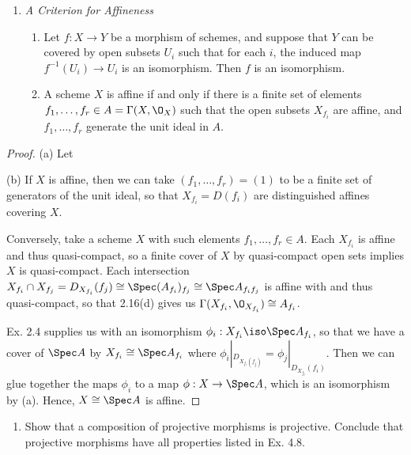 \documentclass[12pt]{amsart}
\begin{document}
\begin{enumerate}
  \item[2.17.] {
      \emph{A Criterion for Affineness}
      \begin{enumerate}
        \item Let $f:X\to Y$ be a morphism of schemes, and suppose that $Y$ can be covered by open subsets $U_i$ such that for each $i$, the induced map $f^{-1}(U_i)\to U_i$ is an isomorphism.
          Then $f$ is an isomorphism.
        \item A scheme $X$ is affine if and only if there is a finite set of elements $f_1,\ldots, f_r\in A=\Gamma(X,\O_X)$ such that the open subsets $X_{f_i}$ are affine, and $f_1,\ldots, f_r$ generate the unit ideal in $A$.
      \end{enumerate}
    }
\end{enumerate}

\begin{proof}
  (a) Let 

  (b) If $X$ is affine, then we can take $(f_1,\ldots, f_r)=(1)$ to be a finite set of generators of the unit ideal, so that $X_{f_i}=D(f_i)$ are distinguished affines covering $X$.
  
  Conversely, take a scheme $X$ with such elements $f_1,\ldots, f_r\in A$.
  Each $X_{f_i}$ is affine and thus quasi-compact, so a finite cover of $X$ by quasi-compact open sets implies $X$ is quasi-compact.
  Each intersection $X_{f_i}\cap X_{f_j}=D_{X_{f_i}}(f_j)\cong \Spec (A_{f_i})_{f_j}\cong \Spec A_{f_if_j}$ is affine with and thus quasi-compact, so that 2.16(d) gives us $\Gamma(X_{f_i},\O_{X_{f_i}})\cong A_{f_i}$.

  Ex. 2.4 supplies us with an isomorphism $\phi_i:X_{f_i}\iso\Spec A_{f_i}$, so that we have a cover of $\Spec A$ by $X_{f_i}\cong \Spec A_{f_i}$ where $\phi_i|_{D_{X_{f_i}(f_j)}}=\phi_j|_{D_{X_{f_j}}(f_i)}$.
  Then we can glue together the maps $\phi_i$ to a map $\phi:X\to \Spec A$, which is an isomorphism by (a).
  Hence, $X\cong \Spec A$ is affine.
\end{proof}

\begin{enumerate}
  \item[4.9.] {
      Show that a composition of projective morphisms is projective.
      Conclude that projective morphisms have all properties listed in Ex. 4.8.
    }
\end{enumerate}
\end{document}
